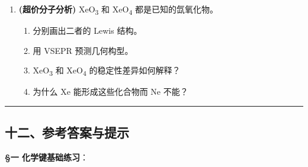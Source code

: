 \documentclass[a4paper,11pt]{ctexart}
\providecommand{\tightlist}{\setlength{\itemsep}{0pt}\setlength{\parskip}{0pt}}
\newcommand{\箭}{\ensuremath{\rightarrow}}
\newcommand{\左箭}{\ensuremath{\leftarrow}}
\newcommand{\上箭}{\ensuremath{\uparrow}}
\newcommand{\下箭}{\ensuremath{\downarrow}}
\newcommand{\衡}{\ensuremath{\rightleftharpoons}}
\newcommand{\双箭}{\ensuremath{\leftrightarrow}}
\newcommand{\约等于}{\ensuremath{\approx}}
\newcommand{\小于等于}{\ensuremath{\leq}}
\newcommand{\大于等于}{\ensuremath{\geq}}
\newcommand{\不等于}{\ensuremath{\neq}}
\newcommand{\西格马}{\ensuremath{\sigma}}
\newcommand{\派}{\ensuremath{\pi}}
\begin{document}
\begin{enumerate}
  \begin{itemize}
  \tightlist
  \item
    含一个第二周期中心原子 A 和两个相同配体 B
  \item
    A 的氧化态为 +4
  \item
    分子具有顺磁性
  \item
    总价电子数为 18
  \end{itemize}

  \begin{enumerate}
  \def\labelenumii{(\alph{enumii})}
  \tightlist
  \item
    推断 X 的可能化学式。
  \item
    画出 Lewis 结构和 MO 能级图。
  \item
    解释其顺磁性的来源。
  \end{enumerate}
\item
  \textbf{(超价分子分析)} XeO\textsubscript{3} 和 XeO\textsubscript{4} 都是已知的氙氧化物。

  \begin{enumerate}
  \def\labelenumii{(\alph{enumii})}
  \tightlist
  \item
    分别画出二者的 Lewis 结构。
  \item
    用 VSEPR 预测几何构型。
  \item
    XeO\textsubscript{3} 和 XeO\textsubscript{4} 的稳定性差异如何解释？
  \item
    为什么 Xe 能形成这些化合物而 Ne 不能？
  \end{enumerate}
\end{enumerate}

\begin{center}\rule{0.5\linewidth}{0.5pt}\end{center}

\subsection{十二、参考答案与提示}\label{ux5341ux4e8cux53c2ux8003ux7b54ux6848ux4e0eux63d0ux793a}

\textbf{§一 化学键基础练习}：
\end{document}
